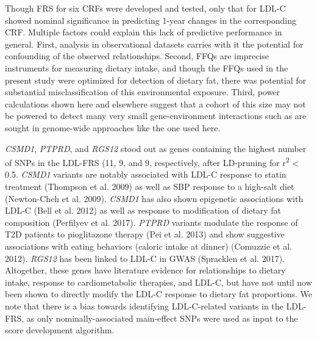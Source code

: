 \documentclass[]{article}
\begin{document}
Though FRS for six CRFs were developed and tested, only that for LDL-C
showed nominal significance in predicting 1-year changes in the
corresponding CRF. Multiple factors could explain this lack of
predictive performance in general. First, analysis in observational
datasets carries with it the potential for confounding of the observed
relationships. Second, FFQs are imprecise instruments for measuring
dietary intake, and though the FFQs used in the present study were
optimized for detection of dietary fat, there was potential for
substantial misclassification of this environmental exposure. Third,
power calculations shown here and elsewhere suggest that a cohort of
this size may not be powered to detect many very small gene-environment
interactions such as are sought in genome-wide approaches like the one
used here.

\emph{CSMD1}, \emph{PTPRD}, and \emph{RGS12} stood out as genes
containing the highest number of SNPs in the LDL-FRS (11, 9, and 9,
respectively, after LD-pruning for r\textsuperscript{2} \textless{} 0.5.
\emph{CSMD1} variants are notably associated with LDL-C response to
statin treatment (Thompson et al. 2009) as well as SBP response to a
high-salt diet (Newton-Cheh et al. 2009). \emph{CSMD1} has also shown
epigenetic associations with LDL-C (Bell et al. 2012) as well as
response to modification of dietary fat composition (Perfilyev et al.
2017). \emph{PTPRD} variants modulate the response of T2D patients to
pioglitazone therapy (Pei et al. 2013) and show suggestive associations
with eating behaviors (caloric intake at dinner) (Comuzzie et al. 2012).
\emph{RGS12} has been linked to LDL-C in GWAS (Spracklen et al. 2017).
Altogether, these genes have literature evidence for relationships to
dietary intake, response to cardiometabolic therapies, and LDL-C, but
have not until now been shown to directly modify the LDL-C response to
dietary fat proportions. We note that there is a bias towards
identifying LDL-C-related variants in the LDL-FRS, as only
nominally-associated main-effect SNPs were used as input to the score
development algorithm.
\end{document}
